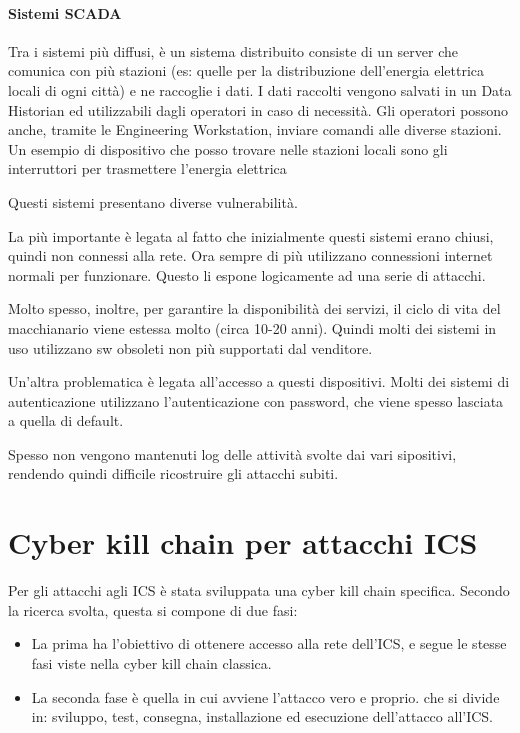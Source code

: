 \paragraph{Sistemi SCADA} Tra i sistemi più diffusi, è un sistema distribuito consiste di un server che comunica con più stazioni (es: quelle per la distribuzione dell'energia elettrica locali di ogni città) e ne raccoglie i dati. I dati raccolti vengono salvati in un Data Historian ed utilizzabili dagli operatori in caso di necessità. Gli operatori possono anche, tramite le Engineering Workstation, inviare comandi alle diverse stazioni. Un esempio di dispositivo che posso trovare nelle stazioni locali sono gli interruttori per trasmettere l'energia elettrica 

Questi sistemi presentano diverse vulnerabilità. 

La più importante è legata al fatto che  inizialmente questi sistemi erano chiusi, quindi non connessi alla rete. Ora sempre di più utilizzano connessioni internet normali per funzionare. Questo li espone logicamente ad una serie di attacchi.

Molto spesso, inoltre, per garantire la disponibilità dei servizi, il ciclo di vita del macchianario viene estessa molto (circa 10-20 anni). Quindi molti dei sistemi in uso utilizzano sw obsoleti non più supportati dal venditore.

Un'altra problematica è legata all'accesso a questi dispositivi. Molti dei sistemi di autenticazione utilizzano l'autenticazione con password, che viene spesso lasciata a quella di default.

Spesso non vengono mantenuti log delle attività svolte dai vari sipositivi, rendendo quindi difficile ricostruire gli attacchi subiti.

\section{Cyber kill chain per attacchi ICS}

Per gli attacchi agli ICS è stata sviluppata una cyber kill chain specifica. Secondo la ricerca svolta, questa si compone di due fasi:
\begin{itemize}
    \item La prima ha l'obiettivo di ottenere accesso alla rete dell'ICS, e segue le stesse fasi viste nella cyber kill chain classica.
    \item La seconda fase è quella in cui avviene l'attacco vero e proprio. che si divide in: sviluppo, test, consegna, installazione ed esecuzione dell'attacco all'ICS.
\end{itemize}


